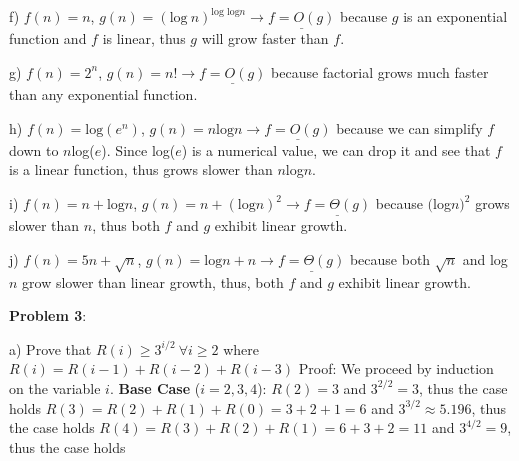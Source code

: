 \documentclass{article} %
\newcommand{\question}[2][]{\begin{flushleft}
        \textbf{Problem #1}: \textit{#2}

\end{flushleft}}
\begin{document}
    \vspace{5pt}

    f) $f(n) = n$, $g(n) = (\text{log}\ n)^{\text{log log} n} \rightarrow \underline{f = O(g)}$ 
    because $g$ is an exponential function and $f$ is 
    \tabto{28pt} linear, thus $g$ will grow faster than $f$.

    \vspace{5pt}

    g) $f(n) = 2^n$, $g(n) = n! \rightarrow \underline{f = O(g)}$
    because factorial grows much faster than any exponential 
    \tabto{28pt} function.

    \vspace{5pt}

    h) $f(n) = \text{log}(e^n)$, $g(n) = n \text{log}n \rightarrow \underline{f = O(g)}$ 
    because we can simplify $f$ down to $n$log($e$). Since
    \tabto{28pt} log($e$) is a numerical value, we can drop it and see that $f$ is a linear function, thus grows
    \tabto{28pt} slower than $n$log$n$.

    \vspace{5pt}

    i) $f(n) = n + \text{log}n$, $g(n) = n + (\text{log}n)^2 \rightarrow \underline{f = \Theta(g)}$
    because $($log$n)^2$ grows slower than $n$, thus 
    \tabto{26pt} both $f$ and $g$ exhibit linear growth.

    \vspace{5pt}

    j) $f(n) = 5n + \sqrt{n}$, $g(n) = \text{log}n + n \rightarrow \underline{f = \Theta(g)}$
    because both $\sqrt{n}$ and log$n$ grow slower than 
    \tabto{26pt} linear growth, thus, both $f$ and $g$ exhibit linear growth.

    \newpage

    \question[3]{}
    
    a) Prove that $R(i) \geq  3^{i/2}\ \forall i \geq 2$ where $R(i) = R(i - 1) + R(i - 2) + R(i - 3) $
    \vspace{5pt}
    \tabto{28pt} Proof:
    \tabto{28pt} We proceed by induction on the variable $i$.
    \tabto{28pt} \textbf{Base Case} ($i = 2, 3, 4$):
    \tabto{28pt} $R(2) = 3$ and $3^{2/2} = 3$, thus the case holds
    \tabto{28pt} $R(3) = R(2) + R(1) + R(0) = 3+2+1=6$ and $3^{3/2} \approx 5.196$, thus the case holds
    \tabto{28pt} $R(4) = R(3) + R(2) + R(1) = 6+3+2=11$ and $3^{4/2} = 9$, thus the case holds
    
    \vspace{5pt}
\end{document}
